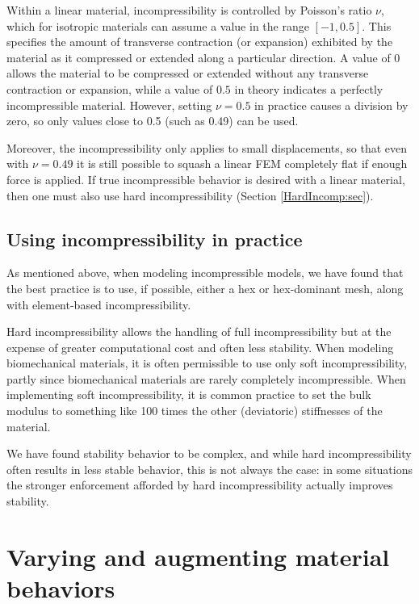 Within a linear material, incompressibility is controlled by Poisson's
ratio $\nu$, which for isotropic materials can assume a value in the
range $[-1, 0.5]$. This specifies the amount of transverse contraction
(or expansion) exhibited by the material as it compressed or extended
along a particular direction. A value of $0$ allows the material to be
compressed or extended without any transverse contraction or
expansion, while a value of $0.5$ in theory indicates a perfectly
incompressible material. However, setting $\nu = 0.5$ in practice
causes a division by zero, so only values close to 0.5 (such as 0.49)
can be used. 

Moreover, the incompressibility only applies to small displacements,
so that even with $\nu = 0.49$ it is still possible to squash a linear
FEM completely flat if enough force is applied. If true incompressible
behavior is desired with a linear material, then one must also use
hard incompressibility (Section \ref{HardIncomp:sec}).

\subsection{Using incompressibility in practice}

As mentioned above, when modeling incompressible models, we have found
that the best practice is to use, if possible, either a hex or
hex-dominant mesh, along with element-based incompressibility.

Hard incompressibility allows the handling of full incompressibility
but at the expense of greater computational cost and often less
stability. When modeling biomechanical materials, it is often
permissible to use only soft incompressibility, partly since
biomechanical materials are rarely completely incompressible.  When
implementing soft incompressibility, it is common practice to set the
bulk modulus to something like 100 times the other (deviatoric)
stiffnesses of the material.

We have found stability behavior to be complex, and while hard
incompressibility often results in less stable behavior, this is not
always the case: in some situations the stronger enforcement afforded
by hard incompressibility actually improves stability.

\section{Varying and augmenting material behaviors}
\label{sec:augmentingMaterials}

